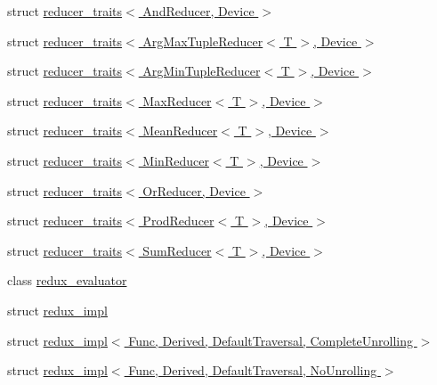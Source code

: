 \begin{DoxyCompactItemize}
\item 
struct \hyperlink{struct_eigen_1_1internal_1_1reducer__traits_3_01_and_reducer_00_01_device_01_4}{reducer\+\_\+traits$<$ And\+Reducer, Device $>$}
\item 
struct \hyperlink{struct_eigen_1_1internal_1_1reducer__traits_3_01_arg_max_tuple_reducer_3_01_t_01_4_00_01_device_01_4}{reducer\+\_\+traits$<$ Arg\+Max\+Tuple\+Reducer$<$ T $>$, Device $>$}
\item 
struct \hyperlink{struct_eigen_1_1internal_1_1reducer__traits_3_01_arg_min_tuple_reducer_3_01_t_01_4_00_01_device_01_4}{reducer\+\_\+traits$<$ Arg\+Min\+Tuple\+Reducer$<$ T $>$, Device $>$}
\item 
struct \hyperlink{struct_eigen_1_1internal_1_1reducer__traits_3_01_max_reducer_3_01_t_01_4_00_01_device_01_4}{reducer\+\_\+traits$<$ Max\+Reducer$<$ T $>$, Device $>$}
\item 
struct \hyperlink{struct_eigen_1_1internal_1_1reducer__traits_3_01_mean_reducer_3_01_t_01_4_00_01_device_01_4}{reducer\+\_\+traits$<$ Mean\+Reducer$<$ T $>$, Device $>$}
\item 
struct \hyperlink{struct_eigen_1_1internal_1_1reducer__traits_3_01_min_reducer_3_01_t_01_4_00_01_device_01_4}{reducer\+\_\+traits$<$ Min\+Reducer$<$ T $>$, Device $>$}
\item 
struct \hyperlink{struct_eigen_1_1internal_1_1reducer__traits_3_01_or_reducer_00_01_device_01_4}{reducer\+\_\+traits$<$ Or\+Reducer, Device $>$}
\item 
struct \hyperlink{struct_eigen_1_1internal_1_1reducer__traits_3_01_prod_reducer_3_01_t_01_4_00_01_device_01_4}{reducer\+\_\+traits$<$ Prod\+Reducer$<$ T $>$, Device $>$}
\item 
struct \hyperlink{struct_eigen_1_1internal_1_1reducer__traits_3_01_sum_reducer_3_01_t_01_4_00_01_device_01_4}{reducer\+\_\+traits$<$ Sum\+Reducer$<$ T $>$, Device $>$}
\item 
class \hyperlink{class_eigen_1_1internal_1_1redux__evaluator}{redux\+\_\+evaluator}
\item 
struct \hyperlink{struct_eigen_1_1internal_1_1redux__impl}{redux\+\_\+impl}
\item 
struct \hyperlink{struct_eigen_1_1internal_1_1redux__impl_3_01_func_00_01_derived_00_01_default_traversal_00_01_complete_unrolling_01_4}{redux\+\_\+impl$<$ Func, Derived, Default\+Traversal, Complete\+Unrolling $>$}
\item 
struct \hyperlink{struct_eigen_1_1internal_1_1redux__impl_3_01_func_00_01_derived_00_01_default_traversal_00_01_no_unrolling_01_4}{redux\+\_\+impl$<$ Func, Derived, Default\+Traversal, No\+Unrolling $>$}

\end{DoxyCompactItemize}
